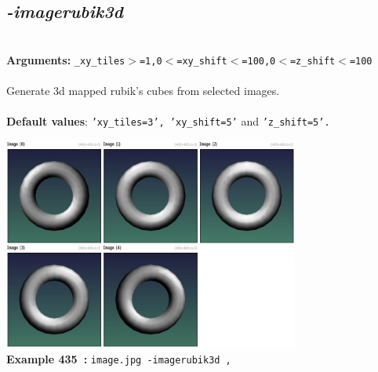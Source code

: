 \documentclass[a4paper,11pt,twoside]{book}
\begin{document}
\subsection{\emph{-imagerubik3d} }\vspace*{-0.5em}
~\\\textbf{Arguments: } 
{\small \texttt{\_xy\_tiles$>$=1,0$<$=xy\_shift$<$=100,0$<$=z\_shift$<$=100}}\\~\\
Generate 3d mapped rubik's cubes from selected images.
~\\~\\\textbf{Default values}: {\small \texttt{'xy\_tiles=3', 'xy\_shift=5'} and \texttt{'z\_shift=5'.}}
\begin{center}\includegraphics[keepaspectratio=true,height=7cm,width=\textwidth]{img/gmic_def435.jpg}\\
{\footnotesize \textbf{Example 435~:} \texttt{image.jpg -imagerubik3d ,}}
\end{center}
\end{document}

